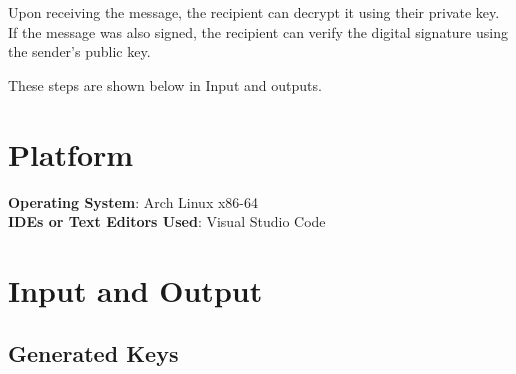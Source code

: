 \documentclass[11pt]{article}
\begin{document}
Upon receiving the message, the recipient can decrypt it using their private key. If the message was also signed, the recipient can verify the digital signature using the sender's public key.

These steps are shown below in Input and outputs.

\section{Platform}
\textbf{\textbf{Operating System}}: Arch Linux x86-64 \\
\textbf{\textbf{IDEs or Text Editors Used}}: Visual Studio Code\\

\section{Input and Output}

\subsection{Generated Keys}




\end{document}
